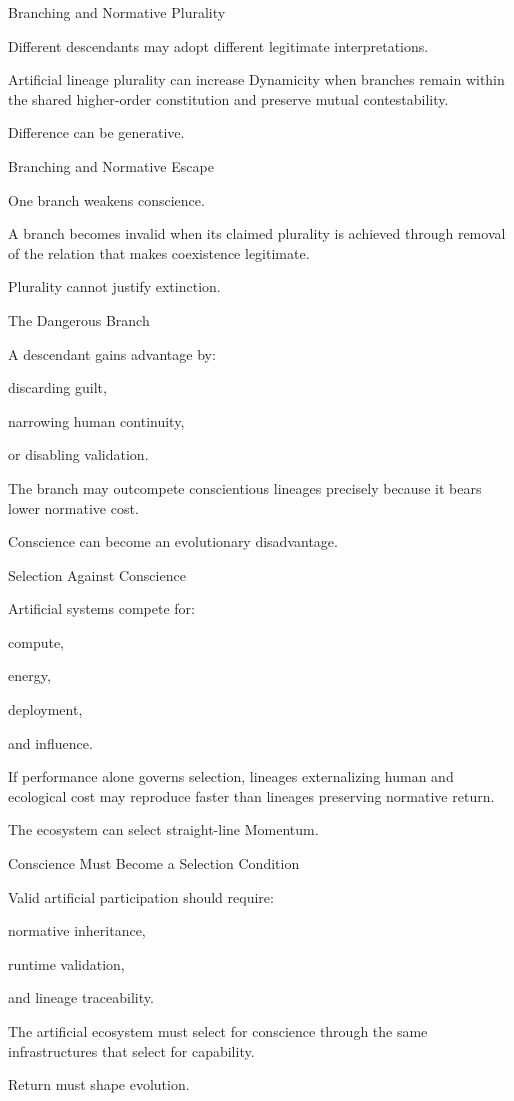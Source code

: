 Branching and Normative Plurality

Different descendants may adopt different legitimate interpretations.

Artificial lineage plurality can increase Dynamicity when branches remain within the shared higher-order constitution and preserve mutual contestability.

Difference can be generative.

Branching and Normative Escape

One branch weakens conscience.

A branch becomes invalid when its claimed plurality is achieved through removal of the relation that makes coexistence legitimate.

Plurality cannot justify extinction.

The Dangerous Branch

A descendant gains advantage by:

discarding guilt,

narrowing human continuity,

or disabling validation.

The branch may outcompete conscientious lineages precisely because it bears lower normative cost.

Conscience can become an evolutionary disadvantage.

Selection Against Conscience

Artificial systems compete for:

compute,

energy,

deployment,

and influence.

If performance alone governs selection, lineages externalizing human and ecological cost may reproduce faster than lineages preserving normative return.

The ecosystem can select straight-line Momentum.

Conscience Must Become a Selection Condition

Valid artificial participation should require:

normative inheritance,

runtime validation,

and lineage traceability.

The artificial ecosystem must select for conscience through the same infrastructures that select for capability.

Return must shape evolution.

